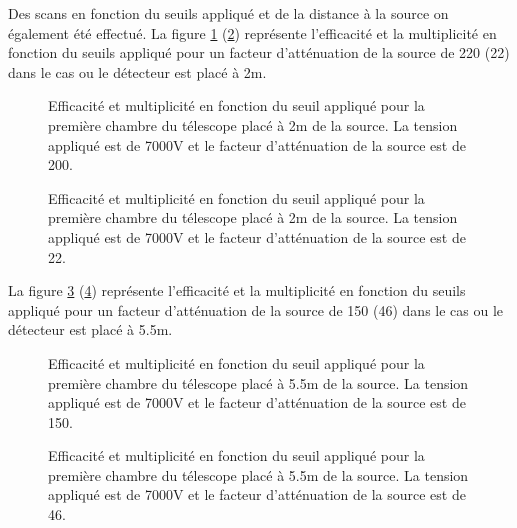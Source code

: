 Des scans en fonction du seuils appliqué et de la distance à la source on également été effectué. La figure \ref{att200} (\ref{att22}) représente l'efficacité et la multiplicité en fonction du seuils appliqué pour un facteur d'atténuation de la source de 220 (22) dans le cas ou le détecteur est placé à 2m.

\begin{figure}[ht!]
	\centering
	\hfill
	\caption{Efficacité et multiplicité en fonction du seuil appliqué pour la première chambre du télescope placé à 2m de la source. La tension appliqué est de 7000V et le facteur d'atténuation de la source est de 200.}
	\label{att200}
\end{figure}

\begin{figure}[ht!]
	\centering
	\hfill
	\caption{Efficacité et multiplicité en fonction du seuil appliqué pour la première chambre du télescope placé à 2m de la source. La tension appliqué est de 7000V et le facteur d'atténuation de la source est de 22.}
	\label{att22}
\end{figure}

La figure \ref{att150} (\ref{att46}) représente l'efficacité et la multiplicité en fonction du seuils appliqué pour un facteur d'atténuation de la source de 150 (46) dans le cas ou le détecteur est placé à 5.5m.

\begin{figure}[ht!]
	\centering
	\hfill
	\caption{Efficacité et multiplicité en fonction du seuil appliqué pour la première chambre du télescope placé à 5.5m de la source. La tension appliqué est de 7000V et le facteur d'atténuation de la source est de 150.}
	\label{att150}
\end{figure}

\begin{figure}[ht!]
	\centering
	\hfill
	\caption{Efficacité et multiplicité en fonction du seuil appliqué pour la première chambre du télescope placé à 5.5m de la source. La tension appliqué est de 7000V et le facteur d'atténuation de la source est de 46.}
	\label{att46}
\end{figure}


